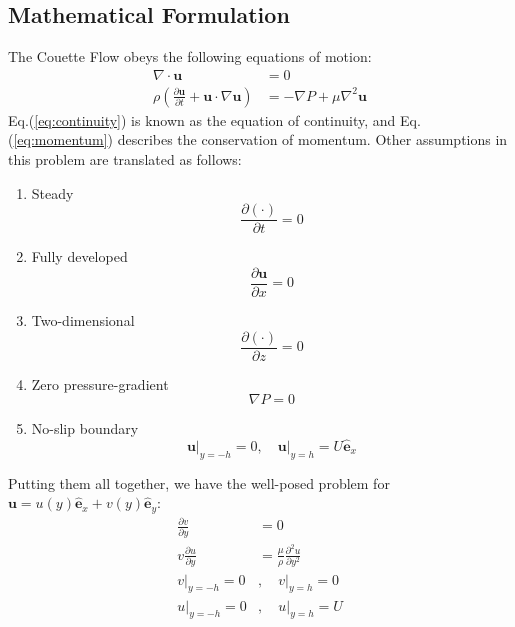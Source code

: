 \graphicspath{ {./YX/} }

\begin{solution}

  \subsection{Mathematical Formulation}
    The Couette Flow obeys the following equations of motion:
    \begin{align}
      \nabla\cdot\mathbf{u}&=0 \label{eq:continuity}\\
      \rho\left(\frac{\partial\mathbf{u}}{\partial t}+\mathbf{u}\cdot\nabla\mathbf{u}\right)
      &=-\nabla P+\mu\nabla^2\mathbf{u} \label{eq:momentum}
    \end{align}
    Eq.(\ref{eq:continuity}) is known as the equation of continuity, and Eq.(\ref{eq:momentum}) describes the conservation of momentum. Other assumptions in this problem are translated as follows:
    \begin{enumerate}
      \item Steady
        \begin{equation}
          \frac{\partial (\cdot)}{\partial t}=0
        \end{equation}
      \item Fully developed
        \begin{equation}
          \frac{\partial\mathbf{u}}{\partial x}=0
        \end{equation}
      \item Two-dimensional
        \begin{equation}
          \frac{\partial (\cdot)}{\partial z}=0
        \end{equation}
      \item Zero pressure-gradient
        \begin{equation}
          \nabla P=0
        \end{equation}
      \item No-slip boundary
        \begin{equation}
          \mathbf{u}\big|_{y=-h}=0, \quad
          \mathbf{u}\big|_{y=h}=U\hat{\mathbf e}_x
        \end{equation}
    \end{enumerate}
    Putting them all together, we have the well-posed problem for $\mathbf{u}=u(y)\hat{\mathbf{e}}_x+v(y)\hat{\mathbf{e}}_y$:
    \begin{align}
      \frac{\partial v}{\partial y}&=0 \\
      v\frac{\partial u}{\partial y}&=\frac{\mu}{\rho}\frac{\partial^2 u}{\partial y^2} \\
      v\big|_{y=-h}=0&,\quad v\big|_{y=h}=0 \\
      u\big|_{y=-h}=0&,\quad u\big|_{y=h}=U
    \end{align}

\end{solution}



